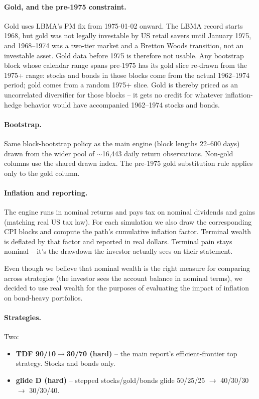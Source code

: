 \documentclass[11pt]{article}
\begin{document}
\paragraph{Gold, and the pre-1975 constraint.} Gold uses LBMA's PM fix from 1975-01-02 onward. The
LBMA record starts 1968, but gold was not legally investable by US retail savers until January 1975,
and 1968--1974 was a two-tier market and a Bretton Woods transition, not an investable asset. Gold
data before 1975 is therefore not usable. Any bootstrap block whose calendar range spans pre-1975
has its gold slice re-drawn from the 1975+ range: stocks and bonds in those blocks come from the
actual 1962--1974 period; gold comes from a random 1975+ slice. Gold is thereby priced as an
uncorrelated diversifier for those blocks -- it gets no credit for whatever inflation-hedge
behavior would have accompanied 1962--1974 stocks and bonds.

\paragraph{Bootstrap.} Same block-bootstrap policy as the main engine (block lengths 22--600 days)
drawn from the wider pool of $\sim$16{,}443 daily return observations. Non-gold columns use the
shared drawn index. The pre-1975 gold substitution rule applies only to the gold column.

\paragraph{Inflation and reporting.} The engine runs in nominal returns and pays tax on nominal
dividends and gains (matching real US tax law). For each simulation we also draw the corresponding
CPI blocks and compute the path's cumulative inflation factor. Terminal wealth is deflated by that
factor and reported in real dollars. Terminal pain stays nominal -- it's the drawdown the investor
actually sees on their statement.

\medskip

\noindent Even though we believe that nominal wealth is the right measure for comparing across
strategies (the investor sees the account balance in nominal terms), we decided to use real wealth
for the purposes of evaluating the impact of inflation on bond-heavy portfolios.

\paragraph{Strategies.} Two:
\begin{itemize}
\item \textbf{TDF 90/10$\to$30/70 (hard)} -- the main report's efficient-frontier top strategy.
Stocks and bonds only.
\item \textbf{glide D (hard)} -- stepped stocks/gold/bonds glide 50/25/25 $\to$ 40/30/30 $\to$
30/30/40.
\end{itemize}
\end{document}
